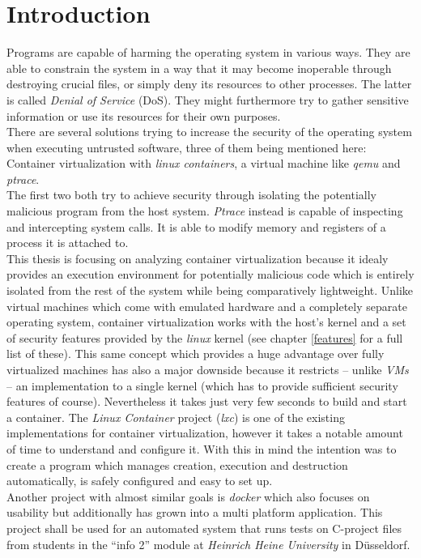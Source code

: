 \chapter{Introduction}

Programs are capable of harming the operating system in various ways. They are able to constrain the system in a way that
it may become inoperable through destroying crucial files, or simply deny its resources to other processes.
The latter is called \textit{Denial of Service} (DoS).
They might furthermore try to gather sensitive information or use its resources for their own purposes.\\
There are several solutions trying to increase the security of the operating system when executing untrusted software,
three of them being mentioned here:\\
Container virtualization with \textit{linux containers}\cite{lxc}, a virtual machine like \textit{qemu}\cite{qemu} and \textit{ptrace}\cite{ptrace}.\\
The first two both try to achieve security through isolating the potentially malicious program from the host system.
\textit{Ptrace} instead is capable of inspecting and intercepting system calls. It is able to modify memory and registers of a process it is attached to.\\
This thesis is focusing on analyzing container virtualization because it idealy provides an execution environment for
potentially malicious code which is entirely isolated from the rest of the system while being comparatively
lightweight. Unlike virtual machines which come with emulated hardware and a completely separate operating
system, container virtualization works with the host's kernel and a set of security features provided by the
\textit{linux} kernel (see chapter \ref{features} for a full list of these).
This same concept which provides a huge advantage over fully virtualized machines has also a major downside
because it restricts -- unlike  \textit{VMs} -- an implementation to a single kernel (which has to provide sufficient
security features of course). Nevertheless it takes just very few seconds to build and start a container.
The \textit{Linux Container} project (\textit{lxc}) is one of the existing implementations for container virtualization,
however it takes a notable amount of time to understand and configure it. With this in mind the intention was to create a program
which manages creation, execution and destruction automatically, is safely configured and easy to set up.\\
Another project with almost similar goals is \textit{docker}\cite{docker} which also focuses on usability but
additionally has grown into a multi platform application.
This project shall be used for an automated system that runs tests on C-project files from students in the ``info 2'' module
at \textit{Heinrich Heine University} in Düsseldorf.
